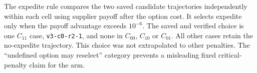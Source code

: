 \documentclass[preprint,11pt,authoryear]{elsarticle}
\begin{document}
The expedite rule compares the two saved candidate trajectories independently within each cell using supplier payoff after the option cost. It selects expedite only when the payoff advantage exceeds $10^{-6}$. The saved and verified choice is one $C_{11}$ case, \texttt{v3-c0-r2-1}, and none in $C_{00}$, $C_{10}$ or $C_{01}$. All other cases retain the no-expedite trajectory. This choice was not extrapolated to other penalties. The ``undefined option may reselect'' category prevents a misleading fixed critical-penalty claim for the arm.
\begingroup\small\setlength{\tabcolsep}{4pt}\renewcommand{\arraystretch}{1.18}
\renewcommand{\thetable}{D1}
\end{document}
